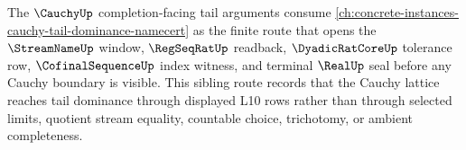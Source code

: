 The $\CauchyUp$ completion-facing tail arguments consume \autoref{ch:concrete-instances-cauchy-tail-dominance-namecert} as the finite route that opens the $\StreamNameUp$ window, $\RegSeqRatUp$ readback, $\DyadicRatCoreUp$ tolerance row, $\CofinalSequenceUp$ index witness, and terminal $\RealUp$ seal before any Cauchy boundary is visible. This sibling route records that the Cauchy lattice reaches tail dominance through displayed L10 rows rather than through selected limits, quotient stream equality, countable choice, trichotomy, or ambient completeness.
